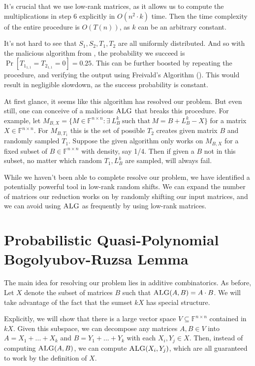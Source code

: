 \documentclass[12pt]{caltech_thesis}
\def\F{\mathbb{F}}
\begin{document}
It's crucial that we use low-rank matrices, as it allows us to compute the multiplications in step 6 explicitly in $O(n^2 \cdot k)$ time. Then the time complexity of the entire procedure is $O(T(n))$, as $k$ can be an arbitrary constant.

It's not hard to see that $S_1, S_2, T_1, T_2$ are all uniformly distributed. And so with the malicious algorithm from , the probability we succeed is $\Pr[T_{1_{1,1}} = T_{2_{1,1}} = 0] = 0.25$. This can be further boosted by repeating the procedure, and verifying the output using Freivald's Algorithm (). This would result in negligible slowdown, as the success probability is constant.

At first glance, it seems like this algorithm has resolved our problem. But even still, one can conceive of a malicious $\textsc{ALG}$ that breaks this procedure. For example, let $M_{B, X} = \{ M \in \F^{n\times n} : \exists\ L_B^k\ \text{such that}\ M = B + L_B^k - X\}$ for a matrix $X \in \F^{n \times n}$. For $M_{B, T_1}$ this is the set of possible $T_2$  creates given matrix $B$ and randomly sampled $T_1$. Suppose the given algorithm only works on $M_{B, X}$ for a fixed subset of $B \in \F^{n\times n}$ with density, say 1/4. Then if given a $B$ not in this subset, no matter which random $T_1, L_B^k$ are sampled,  will always fail.

While we haven't been able to complete resolve our problem, we have identified a potentially powerful tool in low-rank random shifts. We can expand the number of matrices our reduction works on by randomly shifting our input matrices, and we can avoid using $\textsc{ALG}$ as frequently by using low-rank matrices.

\section{Probabilistic Quasi-Polynomial Bogolyubov-Ruzsa Lemma}

The main idea for resolving our problem lies in additive combinatorics. As before, Let $X$ denote the subset of matrices $B$ such that $\textsc{ALG}(A, B) = A \cdot B$. We will take advantage of the fact that the sumset $kX$ has special structure. 

Explicitly, we will show that there is a large vector space $V \subseteq \F^{n\times n}$ contained in $kX$. Given this subspace, we can decompose any matrices $A,B \in V$ into $A = X_1 + ... + X_k$ and $B = Y_1 + ... + Y_k$ with each $X_i,Y_j \in X$. Then, instead of computing $\textsc{ALG}(A,B)$, we can compute $\textsc{ALG}(X_i, Y_j)$, which are all guaranteed to work by the definition of $X$.
\end{document}
